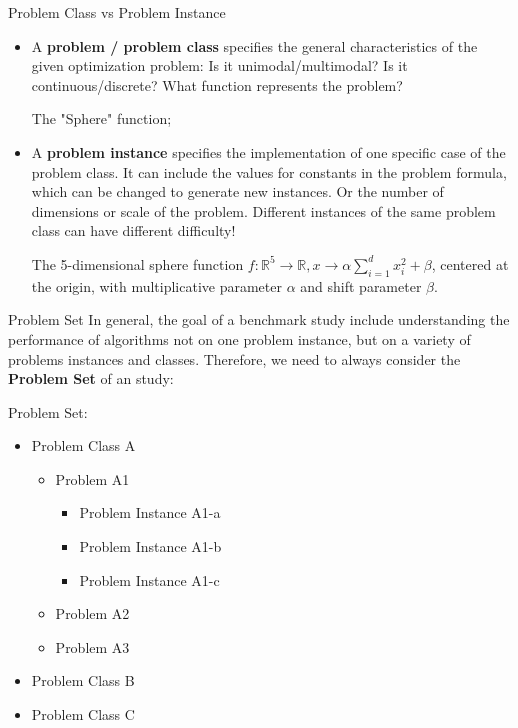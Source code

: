 \documentclass[aspectratio=169]{beamer}
\begin{document}
\begin{frame}[t]{Problem Class vs Problem Instance}
  \begin{itemize}
    \item A {\bf problem / problem class} specifies the general characteristics of the given optimization problem: Is it unimodal/multimodal? Is it continuous/discrete? What function represents the problem? \medskip
    
     The "Sphere" function;\medskip
    \item A {\bf problem instance} specifies the implementation of one specific case of the problem class. It can include the values for constants in the problem formula, which can be changed to generate new instances. Or the number of dimensions or scale of the problem. \alert{Different instances of the same problem class can have different difficulty}!\medskip 
    
     The 5-dimensional sphere function $f: \mathbb{R}^5 \to \mathbb{R}, x\to\alpha\sum^d_{i=1}x^2_i+\beta$, centered at the origin, with multiplicative parameter $\alpha$ and shift parameter $\beta$.
  \end{itemize}
\end{frame}

\begin{frame}[t]{Problem Set}
  In general, the goal of a benchmark study include understanding the performance of algorithms not on one problem instance, but on a variety of problems instances and classes. Therefore, we need to always consider the {\bf Problem Set} of an study:
  \bigskip

  Problem Set:
  \begin{itemize}
    \item Problem Class A
    \begin{itemize}
      \item Problem A1
      \begin{itemize}
        \item Problem Instance A1-a 
        \item Problem Instance A1-b 
        \item Problem Instance A1-c
      \end{itemize}
      \item Problem A2
      \item Problem A3
    \end{itemize}
    \item Problem Class B
    \item Problem Class C 
  \end{itemize}
  
\end{frame}
\end{document}
